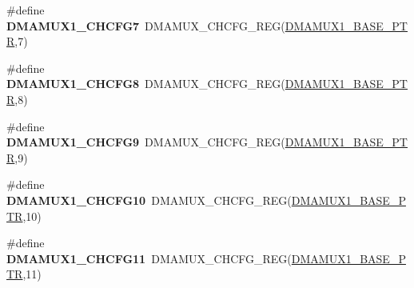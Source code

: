 \begin{DoxyCompactItemize}
\item 
\hypertarget{group___d_m_a_m_u_x___register___accessor___macros_gaa16d7cb180cddd53616fb421714d52f5}{}\#define {\bfseries D\+M\+A\+M\+U\+X1\+\_\+\+C\+H\+C\+F\+G7}~D\+M\+A\+M\+U\+X\+\_\+\+C\+H\+C\+F\+G\+\_\+\+R\+E\+G(\hyperlink{group___d_m_a_m_u_x___peripheral_gad6b43366c6448bd157f17be565d8e1f3}{D\+M\+A\+M\+U\+X1\+\_\+\+B\+A\+S\+E\+\_\+\+P\+T\+R},7)\label{group___d_m_a_m_u_x___register___accessor___macros_gaa16d7cb180cddd53616fb421714d52f5}

\item 
\hypertarget{group___d_m_a_m_u_x___register___accessor___macros_ga9a060baf6df9e5aeaa09202f3b243ed7}{}\#define {\bfseries D\+M\+A\+M\+U\+X1\+\_\+\+C\+H\+C\+F\+G8}~D\+M\+A\+M\+U\+X\+\_\+\+C\+H\+C\+F\+G\+\_\+\+R\+E\+G(\hyperlink{group___d_m_a_m_u_x___peripheral_gad6b43366c6448bd157f17be565d8e1f3}{D\+M\+A\+M\+U\+X1\+\_\+\+B\+A\+S\+E\+\_\+\+P\+T\+R},8)\label{group___d_m_a_m_u_x___register___accessor___macros_ga9a060baf6df9e5aeaa09202f3b243ed7}

\item 
\hypertarget{group___d_m_a_m_u_x___register___accessor___macros_gab598c45d6ec52e889f9525ae9df7e699}{}\#define {\bfseries D\+M\+A\+M\+U\+X1\+\_\+\+C\+H\+C\+F\+G9}~D\+M\+A\+M\+U\+X\+\_\+\+C\+H\+C\+F\+G\+\_\+\+R\+E\+G(\hyperlink{group___d_m_a_m_u_x___peripheral_gad6b43366c6448bd157f17be565d8e1f3}{D\+M\+A\+M\+U\+X1\+\_\+\+B\+A\+S\+E\+\_\+\+P\+T\+R},9)\label{group___d_m_a_m_u_x___register___accessor___macros_gab598c45d6ec52e889f9525ae9df7e699}

\item 
\hypertarget{group___d_m_a_m_u_x___register___accessor___macros_gab20bf082f7439b2f83dad17a9ab71aed}{}\#define {\bfseries D\+M\+A\+M\+U\+X1\+\_\+\+C\+H\+C\+F\+G10}~D\+M\+A\+M\+U\+X\+\_\+\+C\+H\+C\+F\+G\+\_\+\+R\+E\+G(\hyperlink{group___d_m_a_m_u_x___peripheral_gad6b43366c6448bd157f17be565d8e1f3}{D\+M\+A\+M\+U\+X1\+\_\+\+B\+A\+S\+E\+\_\+\+P\+T\+R},10)\label{group___d_m_a_m_u_x___register___accessor___macros_gab20bf082f7439b2f83dad17a9ab71aed}

\item 
\hypertarget{group___d_m_a_m_u_x___register___accessor___macros_ga1650a1ab4577d33a415adad51188725c}{}\#define {\bfseries D\+M\+A\+M\+U\+X1\+\_\+\+C\+H\+C\+F\+G11}~D\+M\+A\+M\+U\+X\+\_\+\+C\+H\+C\+F\+G\+\_\+\+R\+E\+G(\hyperlink{group___d_m_a_m_u_x___peripheral_gad6b43366c6448bd157f17be565d8e1f3}{D\+M\+A\+M\+U\+X1\+\_\+\+B\+A\+S\+E\+\_\+\+P\+T\+R},11)\label{group___d_m_a_m_u_x___register___accessor___macros_ga1650a1ab4577d33a415adad51188725c}


\end{DoxyCompactItemize}
